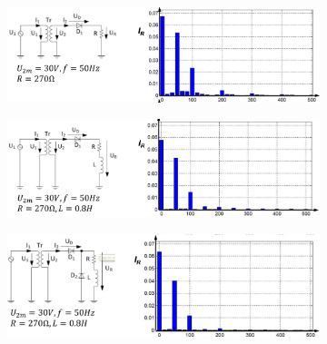 \begin{figure}[h]
	\begin{subfigure}[t]{0.5\linewidth}
		\includegraphics[width=\linewidth]{images/M1UR}
	\end{subfigure}
\begin{subfigure}[t]{0.5\linewidth}
	    \includegraphics[width=\linewidth]{images/M1URL}
\end{subfigure}
\begin{subfigure}[t]{\linewidth}
	\centering
	    \includegraphics[width=0.5\linewidth]{images/M1URLD}
\end{subfigure}
\end{figure}
\vspace{-1.2cm}
